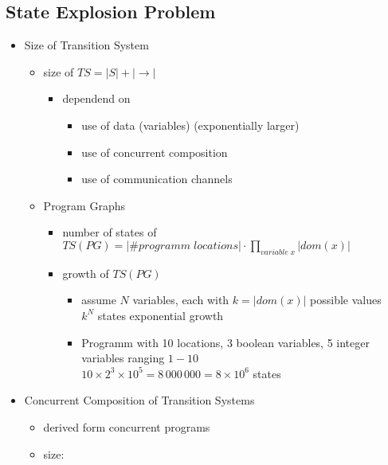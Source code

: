 \documentclass[a4paper, 10pt]{article}
\begin{document}
\subsection*{State Explosion Problem}
\begin{itemize}
    \item Size of Transition System
    \begin{itemize}
        \item size of $TS = |S|+|\to|$
        \begin{itemize}
            \item dependend on
            \begin{itemize}
                \item use of data (variables) (exponentially larger)
                \item use of concurrent composition
                \item use of communication channels
            \end{itemize}
        \end{itemize}
    \end{itemize}
    \begin{itemize}
        \item Program Graphs
        \begin{itemize}
            \item number of states of $ TS(PG)=|\# programm\;locations|\cdot \prod\limits_{variable\; x} |dom(x)|$
            \item growth of $TS(PG)$
            \begin{itemize}
                \item assume $N$ variables, each with $k=|dom(x)|$ possible values
                \\ \follows $k^N$ states {\tiny exponential growth}
                \item Programm with 10 locations, 3 boolean variables, 5 integer variables ranging $1-10$
                \\ $10\times 2^3\times 10^5=8\,000\,000=8\times 10^6$ states
            \end{itemize}
        \end{itemize}
    \end{itemize}
    \item Concurrent Composition of Transition Systems
    \begin{itemize}
        \item derived form concurrent programs
        \item size:

\end{itemize}
\end{itemize}
\end{document}
